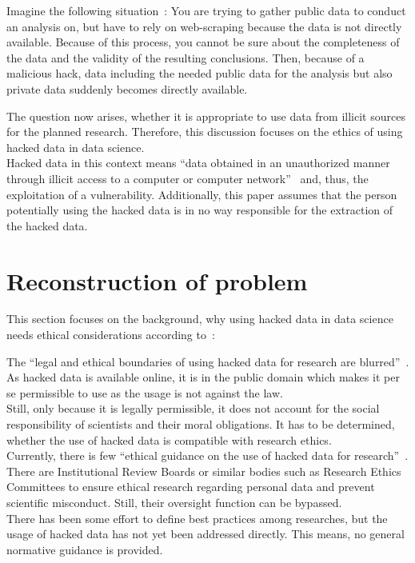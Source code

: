 
Imagine the following situation~\parencite[][1-2]{patreon}:
You are trying to gather public data to conduct an analysis on, but have to rely on web-scraping because the data is not directly available.
Because of this process, you cannot be sure about the completeness of the data and the validity of the resulting conclusions.
Then, because of a malicious hack, data including the needed public data for the analysis but also private data suddenly becomes directly available.

The question now arises, whether it is appropriate to use data from illicit sources for the planned research.
Therefore, this discussion focuses on the ethics of using hacked data in data science.\\
Hacked data in this context means ``data obtained in an unauthorized manner through illicit access to a computer or computer network''~\parencite[][744]{nature} and, thus, the exploitation of a vulnerability.
Additionally, this paper assumes that the person potentially using the hacked data is in no way responsible for the extraction of the hacked data.

\section*{Reconstruction of problem}

This section focuses on the background, why using hacked data in data science needs ethical considerations according to~\cite[][745]{nature}:

The ``legal and ethical boundaries of using hacked data for research are blurred''~\parencite[][745]{nature}.
As hacked data is available online, it is in the public domain which makes it per se permissible to use as the usage is not against the law.\\
Still, only because it is legally permissible, it does not account for the social responsibility of scientists and their moral obligations.
It has to be determined, whether the use of hacked data is compatible with research ethics.\\
Currently, there is few ``ethical guidance on the use of hacked data for research''~\parencite[][745]{nature}.
There are Institutional Review Boards or similar bodies such as Research Ethics Committees to ensure ethical research regarding personal data and prevent scientific misconduct.
Still, their oversight function can be bypassed.\\
There has been some effort to define best practices among researches, but the usage of hacked data has not yet been addressed directly.
This means, no general normative guidance is provided.

